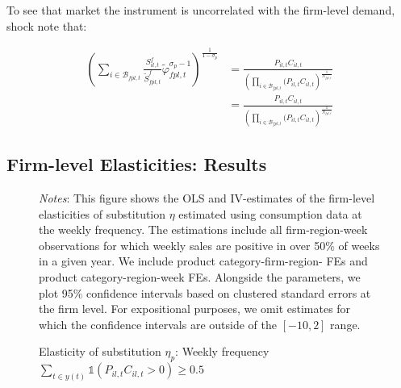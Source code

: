 To see that market the instrument is uncorrelated with the firm-level demand, shock note that: 

\begin{linenomath*}
    \begin{equation*}
        \begin{aligned}
            \left(\sum_{i \in \mathcal{B}_{fpl,t}} \frac{S^f_{il,t}}{\tilde{S}^f_{fpl,t}} \tilde{\varphi}_{fpl,t}^{\sigma_p-1}\right)^{\frac{1}{1-\sigma_p}}
                &=  \frac{P_{il,t}C_{il,t}}
                         {  \left(
                                \prod_{i \in \mathcal{B}_{fpl,t}} \bigg(P_{il,t}C_{il,t}
                            \right)^{\frac{1}{N_{fpl,t}}}} \\
                &=  \frac{P_{il,t}C_{il,t}}
                {           \left(
                                \prod_{i \in \mathcal{B}_{fpl,t}} \bigg(P_{il,t}C_{il,t}
                            \right)^{\frac{1}{N_{fpl,t}}}}
        \end{aligned}
    \end{equation*}
\end{linenomath*}

\subsection{Firm-level Elasticities: Results}
\begin{figure}[H]
    \centering
    \caption{Elasticity of substitution $\eta_p$: Weekly frequency $\sum_{t \in y(t)} \mathbb{1}(P_{il,t}C_{il,t} > 0) \geq 0.5$}
    \label{fig: app_elas_eta_cats_weekly_50ptt}
    
     \parbox{\textwidth}{
        \begin{spacing}{1} 
            {\footnotesize 
            \textit{Notes}: This figure shows the OLS and IV-estimates of the firm-level elasticities of substitution $\eta$ estimated using consumption data at the weekly frequency. The estimations include all firm-region-week observations for which weekly sales are positive in over 50\% of weeks in a given year. We include product category-firm-region- FEs and product category-region-week FEs. Alongside the parameters, we plot 95\% confidence intervals based on clustered standard errors at the firm level. For expositional purposes, we omit estimates for which the confidence intervals are outside of the $[-10,2]$ range.}
        \end{spacing}}
 \end{figure} 

